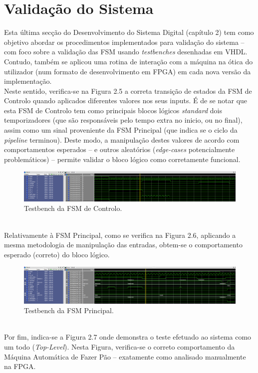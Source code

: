 \documentclass{report}
\begin{document}
\section{Validação do Sistema}
Esta última secção do Desenvolvimento do Sistema Digital (capítulo 2) tem como objetivo abordar os procedimentos implementados para validação do sistema -- com foco sobre a validação das FSM usando \textit{testbenches} desenhadas em VHDL. Contudo, também se aplicou uma rotina de interação com a máquina na ótica do utilizador (num formato de desenvolvimento em FPGA) em cada nova versão da implementação.
\\
Neste sentido, verifica-se na Figura 2.5 a correta transição de estados da FSM de Controlo quando aplicados diferentes valores nos seus inputs. É de se notar que esta FSM de Controlo tem como principais blocos lógicos \textit{standard} dois temporizadores (que são responsáveis pelo tempo extra no inicio, ou no final), assim como um sinal proveniente da FSM Principal (que indica se o ciclo da \textit{pipeline} terminou). Deste modo, a manipulação destes valores de acordo com comportamentos esperados -- e outros aleatórios (\textit{edge-cases} potencialmente problemáticos) -- permite validar o bloco lógico como corretamente funcional.
\begin{figure}[h!] %
	\center
	\includegraphics[width=335pt]{images/FSM1_TB_2}
	\caption{Testbench da FSM de Controlo.}
	\label{fig:imagem4}
\end{figure}
\\
Relativamente à FSM Principal, como se verifica na Figura 2.6, aplicando a mesma metodologia de manipulação das entradas, obtem-se o comportamento esperado (correto) do bloco lógico.
\begin{figure}[h!] %
	\center
	\includegraphics[width=335pt]{images/FSM2_TB_3}
	\caption{Testbench da FSM Principal.}
	\label{fig:imagem4}
\end{figure}
\\
Por fim, indica-se a Figura 2.7 onde demonstra o teste efetuado ao sistema como um todo (\textit{Top-Level}). Nesta Figura, verifica-se o correto comportamento da Máquina Automática de Fazer Pão -- exatamente como analisado manualmente na FPGA.
\end{document}
